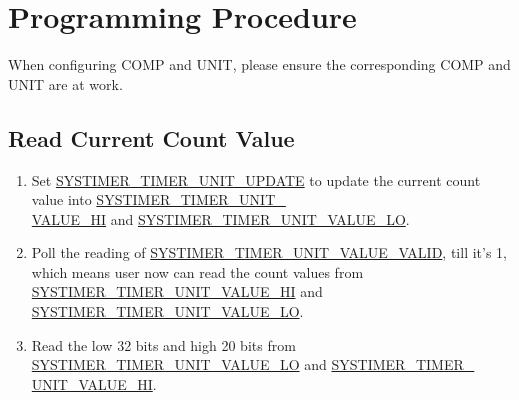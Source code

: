 \documentclass[main\_\_EN.tex]{subfiles}
\begin{document}
\section{Programming Procedure}\label{Instructions of usage}
When configuring COMP and UNIT, please ensure the corresponding COMP and UNIT are at work.
\subsection{Read Current Count Value}\label{To read system timer value}
\begin{enumerate}
    \item Set \hyperref[fielddesc:SYSTIMERTIMERUNIT0UPDATE]{SYSTIMER\_TIMER\_UNIT\_UPDATE} to update the current count value into \hyperref[fielddesc:SYSTIMERTIMERUNIT0VALUEHI]{SYSTIMER\_TIMER\_UNIT\_\\VALUE\_HI} and \hyperref[fielddesc:SYSTIMERTIMERUNIT0VALUELO]{SYSTIMER\_TIMER\_UNIT\_VALUE\_LO}.
    \item Poll the reading of \hyperref[fielddesc:SYSTIMERTIMERUNIT0VALUEVALID]{SYSTIMER\_TIMER\_UNIT\_VALUE\_VALID}, till it's 1, which means user now can read the count values from \hyperref[fielddesc:SYSTIMERTIMERUNIT0VALUEHI]{SYSTIMER\_TIMER\_UNIT\_VALUE\_HI} and \hyperref[fielddesc:SYSTIMERTIMERUNIT0VALUELO]{SYSTIMER\_TIMER\_UNIT\_VALUE\_LO}.
    \item Read the low 32 bits and high 20 bits from \hyperref[fielddesc:SYSTIMERTIMERUNIT0VALUELO]{SYSTIMER\_TIMER\_UNIT\_VALUE\_LO} and \hyperref[fielddesc:SYSTIMERTIMERUNIT0VALUEHI]{SYSTIMER\_TIMER\_\\UNIT{}\_VALUE\_HI}.
\end{enumerate}
\end{document}
